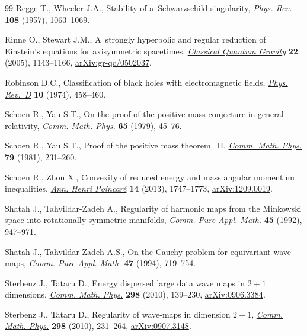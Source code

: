 \documentclass[pdftex]{sigma}
\numberwithin{equation}{section}
\begin{document}
\begin{thebibliography}{99}
Regge T., Wheeler J.A., Stability of a~{S}chwarzschild singularity,
 \href{https://doi.org/10.1103/PhysRev.108.1063}{\textit{Phys. Rev.}}
 \textbf{108} (1957), 1063--1069.

Rinne O., Stewart J.M., A~strongly hyperbolic and regular reduction of
 {E}instein's equations for axisymmetric spacetimes,
 \href{https://doi.org/10.1088/0264-9381/22/6/015}{\textit{Classical Quantum
 Gravity}} \textbf{22} (2005), 1143--1166,
 \href{http://arxiv.org/abs/gr-qc/0502037}{arXiv:gr-qc/0502037}.

Robinson D.C., Classification of black holes with electromagnetic fields,
 \href{https://doi.org/10.1103/PhysRevD.10.458}{\textit{Phys. Rev.~D}}
 \textbf{10} (1974), 458--460.

Schoen R., Yau S.T., On the proof of the positive mass conjecture in general
 relativity, \href{https://doi.org/10.1007/BF01940959}{\textit{Comm. Math.
 Phys.}} \textbf{65} (1979), 45--76.

Schoen R., Yau S.T., Proof of the positive mass theorem.~{II},
 \href{https://doi.org/10.1007/BF01942062}{\textit{Comm. Math. Phys.}}
 \textbf{79} (1981), 231--260.

Schoen R., Zhou X., Convexity of reduced energy and mass angular momentum
 inequalities, \href{https://doi.org/10.1007/s00023-013-0240-1}{\textit{Ann.
 Henri Poincar\'e}} \textbf{14} (2013), 1747--1773,
 \href{http://arxiv.org/abs/1209.0019}{arXiv:1209.0019}.

Shatah J., Tahvildar-Zadeh A., Regularity of harmonic maps from the {M}inkowski
 space into rotationally symmetric manifolds,
 \href{https://doi.org/10.1002/cpa.3160450803}{\textit{Comm. Pure Appl.
 Math.}} \textbf{45} (1992), 947--971.

Shatah J., Tahvildar-Zadeh A.S., On the {C}auchy problem for equivariant wave
 maps, \href{https://doi.org/10.1002/cpa.3160470507}{\textit{Comm. Pure Appl.
 Math.}} \textbf{47} (1994), 719--754.

Sterbenz J., Tataru D., Energy dispersed large data wave maps in {$2+1$}
 dimensions, \href{https://doi.org/10.1007/s00220-010-1061-4}{\textit{Comm.
 Math. Phys.}} \textbf{298} (2010), 139--230,
 \href{http://arxiv.org/abs/0906.3384}{arXiv:0906.3384}.

Sterbenz J., Tataru D., Regularity of wave-maps in dimension {$2+1$},
 \href{https://doi.org/10.1007/s00220-010-1062-3}{\textit{Comm. Math. Phys.}}
 \textbf{298} (2010), 231--264,
 \href{http://arxiv.org/abs/0907.3148}{arXiv:0907.3148}.


\end{thebibliography}
\end{document}
